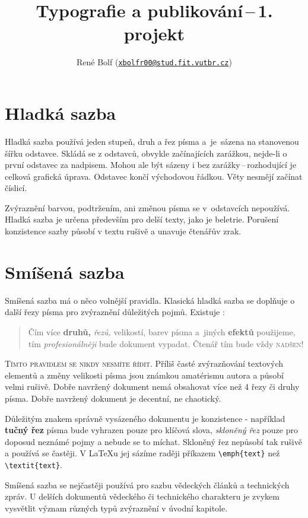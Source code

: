 \documentclass[a4paper,10pt,twocolumn]{article}
\title{Typografie a publikování\,--\,1. projekt}
\author{René Bolf (\href{mailto:xbolfr00@stud.fit.vutbr.cz}{\nolinkurl{xbolfr00@stud.fit.vutbr.cz}})}
\date{}
\begin{document}
\maketitle
\section{Hladká sazba}
Hladká sazba používá jeden stupeň, druh a řez písma a~je~sázena na stanovenou šířku odstavce. Skládá se z odstavců, obvykle začínajících zarážkou, nejde-li o první odstavec za nadpisem. Mohou ale být sázeny i bez zarážky\,--\,rozhodující je celková grafická úprava. Odstavec končí východovou řádkou. Věty nesmějí začínat číslicí.

Zvýraznění barvou, podtržením, ani změnou písma se v~odstavcích nepoužívá. Hladká sazba je určena především pro delší texty, jako je beletrie. Porušení konzistence sazby působí v textu rušivě a unavuje čtenářův zrak.
\section{Smíšená sazba}\label{Smíšená sazba}
Smíšená sazba má o něco volnější pravidla. Klasická hladká sazba se doplňuje o další řezy písma pro zvýraznění důležitých pojmů. Existuje :

\begin{quote}

Čím více \textbf{druhů,} \textit{řezů,} {\footnotesize velikostí,} barev písma \textsf{a~jiných {\tiny \textbf{efektů}}} použijeme, tím \textit{profesionálněji} bude dokument vypadat. Čtenář tím bude {\LARGE vždy} {\Huge \textsc{nadšen!}}\end{quote}

\textsc{Tímto pravidlem se nikdy nesmíte řídit.} Příliš časté zvýrazňování textových elementů a změny velikosti písma jsou známkou amatérismu autora a působí velmi rušivě. Dobře navržený dokument nemá obsahovat více než
4 řezy či druhy písma. Dobře navržený dokument je decentní, ne chaotický.

Důležitým znakem správně vysázeného dokumentu je konzistence - například \textbf{tučný řez} písma bude vyhrazen pouze pro klíčová slova, \textsl{skloněný řez} pouze pro doposud neznámé pojmy a nebude se to míchat. Skloněný řez nepůsobí tak rušivě a používá se častěji. V \LaTeX u jej sázíme raději příkazem \verb|\emph{text}| než \verb|\textit{text}|.

Smíšená sazba se nejčastěji používá pro sazbu vědeckých článků a technických zpráv. U delších dokumentů vědeckého či technického charakteru je zvykem vysvětlit význam různých typů zvýraznění v úvodní kapitole.
\end{document}
